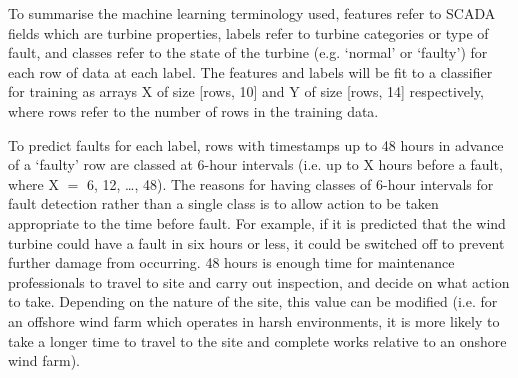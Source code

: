 To summarise the machine learning terminology used, features refer to SCADA fields which are turbine properties, labels refer to turbine categories or type of fault, and classes refer to the state of the turbine (e.g. `normal' or `faulty') for each row of data at each label. The features and labels will be fit to a classifier for training as arrays X of size [rows, 10] and Y of size [rows, 14] respectively, where rows refer to the number of rows in the training data.

To predict faults for each label, rows with timestamps up to 48 hours in advance of a `faulty' row are classed at 6-hour intervals (i.e. up to X hours before a fault, where X $=$ 6, 12, \dots, 48). The reasons for having classes of 6-hour intervals for fault detection rather than a single class is to allow action to be taken appropriate to the time before fault. For example, if it is predicted that the wind turbine could have a fault in six hours or less, it could be switched off to prevent further damage from occurring. 48 hours is enough time for maintenance professionals to travel to site and carry out inspection, and decide on what action to take. Depending on the nature of the site, this value can be modified (i.e. for an offshore wind farm which operates in harsh environments, it is more likely to take a longer time to travel to the site and complete works relative to an onshore wind farm).

